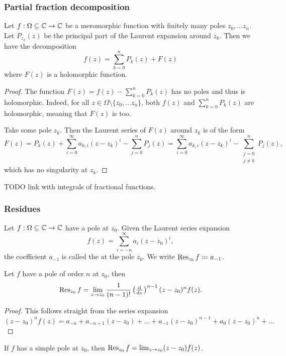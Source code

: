 \subsubsection{Partial fraction decomposition}
\begin{proposition} \label{partialFractionDecomposition}
Let $f: \Omega\subseteq \mathbb{C} \to \mathbb{C}$ be a meromorphic function with finitely many poles $z_0, \ldots z_n$. Let $P_{z_k}(z)$ be the principal part of the Laurent expansion around $z_k$. Then we have the decomposition
\[ f(z) = \sum_{k=0}^nP_k(z) + F(z) \]
where $F(z)$ is a holomorphic function.
\end{proposition}
\begin{proof}
The function $F(z) = f(z) - \sum_{k=0}^nP_k(z)$ has no poles and thus is holomorphic. Indeed, for all $z\in\Omega \setminus \{z_0, \ldots z_n\}$, both $f(z)$ and $\sum_{k=0}^nP_k(z)$ are holomorphic, meaning that $F(z)$ is too.

Take some pole $z_k$. Then the Laurent series of $F(z)$ around $z_k$ is of the form
\[ F(z) = P_k(z) + \sum_{i=0}^\infty a_{k,i}(z-z_k)^i - \sum_{j=0}^n P_j(z) = \sum_{i=0}^\infty a_{k,i}(z-z_k)^i - \sum_{\substack{j=0\\ j\neq k}}^n P_j(z), \]
which has no singularity at $z_k$.
\end{proof}

TODO link with integrals of fractional functions.

\subsubsection{Residues}
\begin{definition}
Let $f: \Omega\subseteq \mathbb{C} \to \mathbb{C}$ have a pole at $z_0$. Given the Laurent series expansion
\[  f(z) = \sum_{i=-n}^\infty a_i(z-z_0)^i, \]
the coefficient $a_{-1}$ is called the  at the pole $z_0$. We write $\operatorname{Res}_{z_0}f \coloneqq a_{-1}$.
\end{definition}

\begin{proposition}
Let $f$ have a pole of order $n$ at $z_0$, then
\[ \Res_{z_0}f = \lim_{z\to z_0}\frac{1}{(n-1)!}\left(\od{}{z}\right)^{n-1}(z-z_0)^nf(z). \]
\end{proposition}
\begin{proof}
This follows straight from the series expansion
\[ (z-z_0)^nf(z) = a_{-n} + a_{-n+1}(z-z_0) + \ldots + a_{-1}(z-z_0)^{n-1} + a_0(z-z_0)^n + \ldots \]
\end{proof}
\begin{corollary}
If $f$ has a simple pole at $z_0$, then $\operatorname{Res}_{z_0} f = \lim_{z\to z_0}(z-z_0)f(z)$.
\end{corollary}

